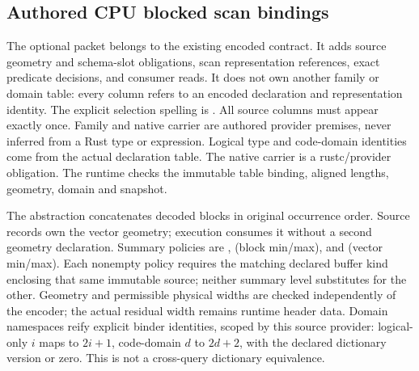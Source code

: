 \subsection{Authored CPU blocked scan bindings}

The optional  packet belongs to the existing encoded contract.
It adds source geometry and schema-slot obligations, scan representation
references, exact predicate decisions, and consumer reads. It does not own
another family or domain table: every column refers to an encoded declaration
and representation identity. The explicit selection spelling is
.
All source columns must appear exactly once. Family and native carrier are
authored provider premises, never inferred from a Rust type or expression.
Logical type and code-domain identities come from the actual declaration
table. The native carrier is a rustc/provider obligation. The runtime checks
the immutable table binding, aligned lengths, geometry, domain and snapshot.

\begin{mathpar}
\end{mathpar}
The abstraction concatenates decoded blocks in original occurrence order.
Source records own the vector geometry; execution consumes it without a second
geometry declaration. Summary policies are , 
(block min/max), and  (vector min/max). Each nonempty policy
requires the matching declared buffer kind enclosing that same immutable source;
neither summary level substitutes for the other.
Geometry and permissible physical widths are checked independently of the
encoder; the actual residual width remains runtime header data. Domain
namespaces reify explicit binder identities, scoped by this source provider:
logical-only $i$ maps to $2i+1$, code-domain $d$ to $2d+2$, with the declared
dictionary version or zero. This is not a cross-query dictionary equivalence.

